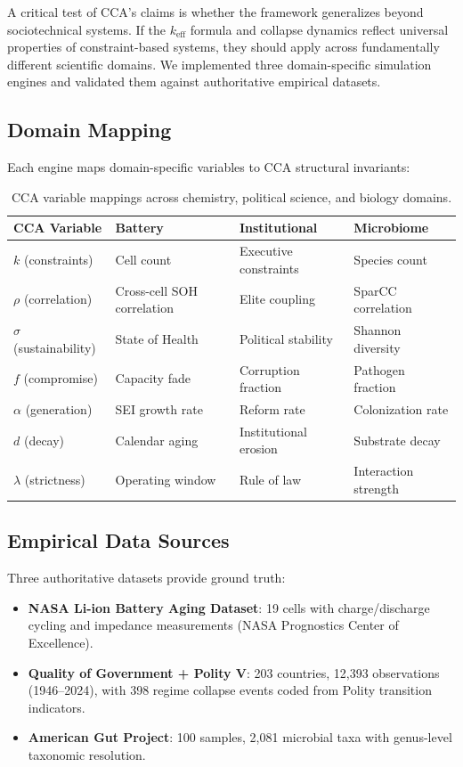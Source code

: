 \documentclass[11pt,a4paper]{article}
\theoremstyle{definition}
\theoremstyle{remark}
\newcommand{\keff}{k_{\text{eff}}}
\begin{document}
A critical test of CCA's claims is whether the framework generalizes beyond sociotechnical systems. If the $\keff$ formula and collapse dynamics reflect universal properties of constraint-based systems, they should apply across fundamentally different scientific domains. We implemented three domain-specific simulation engines and validated them against authoritative empirical datasets.

\subsection{Domain Mapping}

Each engine maps domain-specific variables to CCA structural invariants:

\begin{table}[H]
\centering
\begin{tabular}{llll}
\toprule
\textbf{CCA Variable} & \textbf{Battery} & \textbf{Institutional} & \textbf{Microbiome} \\
\midrule
$k$ (constraints) & Cell count & Executive constraints & Species count \\
$\rho$ (correlation) & Cross-cell SOH correlation & Elite coupling & SparCC correlation \\
$\sigma$ (sustainability) & State of Health & Political stability & Shannon diversity \\
$f$ (compromise) & Capacity fade & Corruption fraction & Pathogen fraction \\
$\alpha$ (generation) & SEI growth rate & Reform rate & Colonization rate \\
$d$ (decay) & Calendar aging & Institutional erosion & Substrate decay \\
$\lambda$ (strictness) & Operating window & Rule of law & Interaction strength \\
\bottomrule
\end{tabular}
\caption{CCA variable mappings across chemistry, political science, and biology domains.}
\label{tab:domain-mapping}
\end{table}

\subsection{Empirical Data Sources}

Three authoritative datasets provide ground truth:

\begin{itemize}[noitemsep]
    \item \textbf{NASA Li-ion Battery Aging Dataset}: 19 cells with charge/discharge cycling and impedance measurements (NASA Prognostics Center of Excellence).
    \item \textbf{Quality of Government + Polity V}: 203 countries, 12,393 observations (1946--2024), with 398 regime collapse events coded from Polity transition indicators.
    \item \textbf{American Gut Project}: 100 samples, 2,081 microbial taxa with genus-level taxonomic resolution.
\end{itemize}
\end{document}
